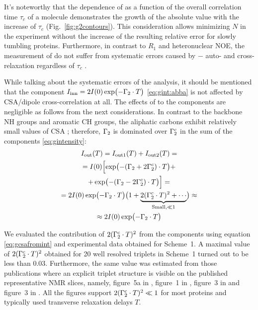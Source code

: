 \documentclass[twocolumn]{svjour3}           %
\begin{document}
It's noteworthy that the dependence of \gtwoCH{} 
as a function of the overall correlation time $ \tau_c $ of a molecule  demonstrates the growth of the \gtwoCH{} absolute 
value with the increase of  $ \tau_c $
(Fig.~\ref{fig:g2contours}). This  consideration allows
minimizing $N$ in the experiment without the increase of the resulting \gtwoCH{} 
relative error for slowly tumbling proteins. Furthermore, in contrast to \clab{} $R_1$ and heteronuclear NOE, the measurement of \gtwoCH{} do not suffer 
from systematic errors caused by \clab{}$-$\clab{} auto- and cross-relaxation regardless of $ \tau_c $
\cite{yang_probing_2011,jin_cross-correlation_2003}.

While talking about the systematic errors of the analysis, it should be
mentioned that the \qinner{} component 
$I_\textrm{inn}{} = 2I(0)\exp \bigl( -{\Gamma_2 \cdot T\bigr)}$ \eqref{eq:gint:abba} 
is not affected by CSA\slash dipole cross-cor\-re\-la\-tion \gtwoCSA{} 
at all. The effects of \gtwoCSA{} to the \qouter{} components are negligible as follows from the next considerations. 
In contrast to the backbone NH groups and aromatic CH groups, 
the aliphatic carbons exhibit relatively small values of CSA 
\cite{ferrage_chapter_2017,banci_side_2001,zheng_measurement_2004};
therefore, $\Gamma_2$ is dominated over $\Gamma_2^c$
in the sum of the \qouter{} components \eqref{eq:gintensity}: 
\begin{multline}
    \label{eq:neglectCSA}
    I_\textrm{out}(T) = I_\textrm{out1}(T) + I_\textrm{out2}(T) = \\
      = I(0)\Bigl[\exp\bigl({-(\Gamma_2 + 2\Gamma_2^c) \cdot T}\bigr) + \\  
       + \exp\bigl({-(\Gamma_2 - 2\Gamma_2^c) \cdot T} \bigr) \Bigr]= \\
     = 2I(0)\exp\bigl({-\Gamma_2 \cdot T} \bigr) 
             \bigl(1+
               \underbrace{ 2(\Gamma_2^c \cdot T)^2+\cdots}_{\text{Small,}\ll 1}
            \bigr) 
      \approx \\
      \approx 2I(0)\exp \bigl( {-\Gamma_2 \cdot T} \bigr)
\end{multline}

We evaluated the contribution of $2(\Gamma_2^c \cdot T)^2$ 
 from the \qouter{} components using equation \eqref{eq:gcsafromint} and
 experimental data obtained for Scheme~1.
 A maximal value of $2(\Gamma_2^c \cdot T)^2$ obtained for 20 well resolved triplets in Scheme~1 turned out to be less
 than 0.03. Furthermore, the same value was estimated
 from those publications where an explicit \clab{} triplet structure 
 is visible  on the published representative NMR slices, namely, 
 figure~5a in \cite{yang_study_1998}, 
 figure~1 in \cite{yang_1h13c_1999}, 
 figure~3 in \cite{banci_side_2001} and 
 figure~3 in  \cite{zheng_measurement_2004}. All the figures
 support $2(\Gamma_2^c \cdot T)^2 \ll 1$ for most proteins and 
 typically used transverse relaxation delays $T$.
\end{document}
